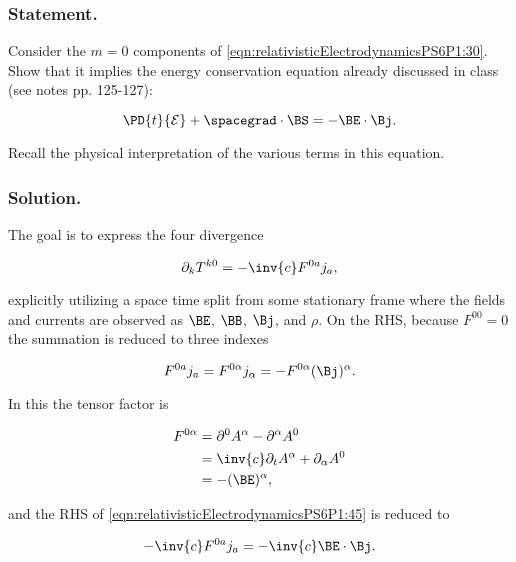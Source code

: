 \subsubsection{Statement.}

Consider the $m = 0$ components of \ref{eqn:relativisticElectrodynamicsPS6P1:30}.  Show that it implies the energy conservation equation already discussed in class (see notes pp. 125-127):

\begin{equation}\label{eqn:relativisticElectrodynamicsPS6P1:40}
\PD{t}{\mathcal{E}} + \spacegrad \cdot \BS = - \BE \cdot \Bj.
\end{equation}

Recall the physical interpretation of the various terms in this equation.

\subsubsection{Solution.}

The goal is to express the four divergence

\begin{equation}\label{eqn:relativisticElectrodynamicsPS6P1:45}
\partial_k T^{k 0} = -\inv{c} F^{0 a} j_a,
\end{equation}

explicitly utilizing a space time split from some stationary frame where the fields and currents are observed as $\BE$, $\BB$, $\Bj$, and $\rho$.  On the RHS, because $F^{0 0} = 0$ the summation is reduced to three indexes

\begin{equation}\label{eqn:relativisticElectrodynamicsPS6P1:80}
F^{0 a} j_a = F^{0 \alpha} j_\alpha = -F^{0 \alpha} (\Bj)^\alpha.
\end{equation}

In this the tensor factor is

\begin{align*}
F^{0 \alpha} 
&= \partial^0 A^\alpha - \partial^\alpha A^0 \\
&= \inv{c} \partial_t A^\alpha + \partial_\alpha A^0 \\
&= -(\BE)^\alpha,
\end{align*}

and the RHS of \ref{eqn:relativisticElectrodynamicsPS6P1:45} is reduced to

\begin{equation}\label{eqn:relativisticElectrodynamicsPS6P1:100}
-\inv{c} F^{0 a} j_a = -\inv{c} \BE \cdot \Bj.
\end{equation}

